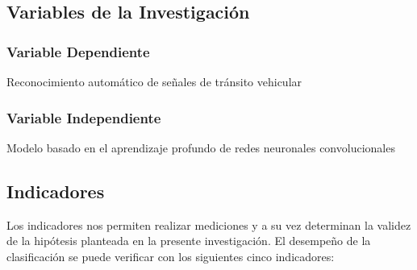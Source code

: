 \subsection{Variables de la Investigación}
		
		\subsubsection{Variable Dependiente}
		\indent Reconocimiento automático de señales de tránsito vehicular
		\subsubsection {Variable Independiente}
		\indent Modelo basado en el aprendizaje profundo de redes neuronales convolucionales	
		
\subsection{Indicadores}
		\renewcommand{\baselinestretch}{2}
		Los indicadores nos permiten realizar mediciones y a su vez determinan la validez de la hipótesis planteada en la presente investigación. El desempeño de la clasificación se puede verificar con los siguientes cinco indicadores: 
